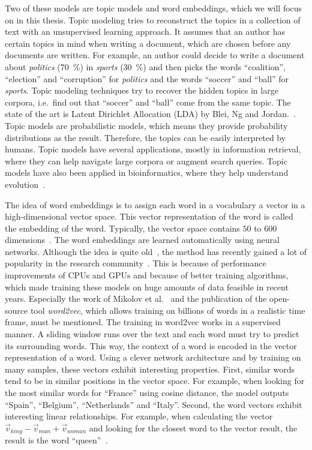 \documentclass[
        a4paper,
        titlepage,
        twoside,
        parskip,
        numbers=noenddot
        ]{scrbook}
\theoremstyle{break}
\begin{document}
Two of these models are topic models and word embeddings, which we will focus on in this thesis.
Topic modeling tries to reconstruct the topics in a collection of text with an unsupervised learning approach.
It assumes that an author has certain topics in mind when writing a document, which are chosen before any documents are written.
For example, an author could decide to write a document about \emph{politics} (70~\%) in \emph{sports} (30~\%) and then picks the words ``coalition'', ``election'' and ``corruption'' for \emph{politics} and the words ``soccer'' and ``ball'' for \emph{sports}.
Topic modeling techniques try to recover the hidden topics in large corpora, i.e.\ find out that ``soccer'' and ``ball'' come from the same topic.
The state of the art is Latent Dirichlet Allocation (LDA) by Blei, Ng and Jordan.~\cite{Blei2003}.
Topic models are probabilistic models, which means they provide probability distributions as the result.
Therefore, the topics can be easily interpreted by humans.
Topic models have several applications, mostly in information retrieval, where they can help navigate large corpora or augment search queries.
Topic models have also been applied in bioinformatics, where they help understand evolution~\cite{Pritchard2000}.

The idea of word embeddings is to assign each word in a vocabulary a vector in a high-dimensional vector space.
This vector representation of the word is called the embedding of the word.
Typically, the vector space contains $50$ to $600$ dimensions~\cite{Mikolov2013}.
The word embeddings are learned automatically using neural networks.
Although the idea is quite old~\cite{Bengio2003,Rumelhart1988}, the method has recently gained a lot of popularity in the research community~\cite{Levy2014,Levy2014a,Mikolov2013b}.
This is because of performance improvements of CPUs and GPUs and because of better training algorithms, which made training these models on huge amounts of data feasible in recent years.
Especially the work of Mikolov et al.~\cite{Mikolov2013b,Mikolov2013,Mikolov2013a} and the publication of the open-source tool \emph{word2vec}, which allows training on billions of words in a realistic time frame, must be mentioned.
The training in word2vec works in a supervised manner.
A sliding window runs over the text and each word must try to predict its surrounding words.
This way, the context of a word is encoded in the vector representation of a word.
Using a clever network architecture and by training on many samples, these vectors exhibit interesting properties.
First, similar words tend to be in similar positions in the vector space.
For example, when looking for the most similar words for ``France'' using cosine distance, the model outputs ``Spain'', ``Belgium'', ``Netherlands'' and ``Italy''.
Second, the word vectors exhibit interesting linear relationships.
For example, when calculating the vector $\vec{v}_{king} - \vec{v}_{man} + \vec{v}_{woman}$ and looking for the closest word to the vector result, the result is the word ``queen''~\cite{Mikolov2013b}.
\end{document}
